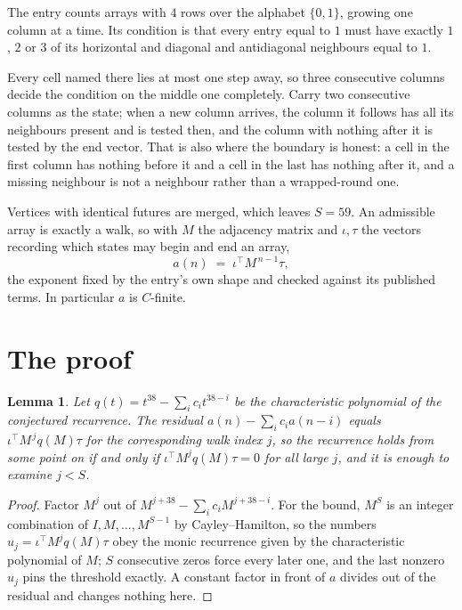 \documentclass[11pt,a4paper]{article}
\theoremstyle{plain}
\newtheorem{lemma}[theorem]{Lemma}
\theoremstyle{definition}
\begin{document}
The entry counts arrays with $4$ rows over the alphabet $\{0,1\}$, growing one column at a time. Its condition is that every entry equal to $1$ must have exactly $1$, $2$ or $3$ of its horizontal and diagonal and antidiagonal neighbours equal to $1$.

Every cell named there lies at most one step away, so three consecutive columns decide the condition on the middle one completely. Carry two consecutive columns as the state; when a new column arrives, the column it follows has all its neighbours present and is tested then, and the column with nothing after it is tested by the end vector. That is also where the boundary is honest: a cell in the first column has nothing before it and a cell in the last has nothing after it, and a missing neighbour is not a neighbour rather than a wrapped-round one.

Vertices with identical futures are merged, which leaves $S=59$. An admissible array is exactly a walk, so with $M$ the adjacency matrix and $\iota,\tau$ the vectors recording which states may begin and end an array,
\[
a(n)\;=\;\iota^{\!\top}M^{\,n-1}\tau ,
\]
the exponent fixed by the entry's own shape and checked against its published terms. In
particular $a$ is $C$-finite.

\section{The proof}

\begin{lemma}\label{lem:crit}
Let $q(t)=t^{38}-\sum_i c_it^{38-i}$ be the characteristic polynomial of the
conjectured recurrence. The residual $a(n)-\sum_ic_ia(n-i)$ equals
$\iota^{\!\top}M^{\,j}q(M)\tau$ for the corresponding walk index $j$, so the recurrence
holds from some point on if and only if $\iota^{\!\top}M^{j}q(M)\tau=0$ for all large $j$,
and it is enough to examine $j<S$.
\end{lemma}

\begin{proof}
Factor $M^{j}$ out of $M^{j+38}-\sum_ic_iM^{j+38-i}$. For the bound, $M^{S}$
is an integer combination of $I,M,\dots,M^{S-1}$ by Cayley--Hamilton, so the numbers
$u_j=\iota^{\!\top}M^{j}q(M)\tau$ obey the monic recurrence given by the characteristic
polynomial of $M$; $S$ consecutive zeros force every later one, and the last nonzero $u_j$
pins the threshold exactly. A constant factor in front of $a$ divides out of the residual and
changes nothing here.
\end{proof}
\end{document}

